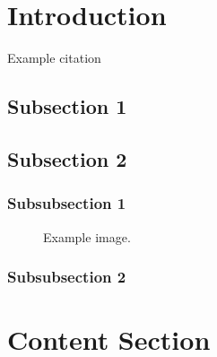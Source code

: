 \documentclass[12pt]{article} %
\begin{document}
\section{Introduction} %

Example citation \cite{ab94}


\subsection{Subsection 1} %



\subsection{Subsection 2} %




\subsubsection{Subsubsection 1} %



\begin{figure}[H] %
\caption{Example image.}
\label{fig:speciation}
\end{figure}


\subsubsection{Subsubsection 2} %




\section{Content Section} %


\end{document}
